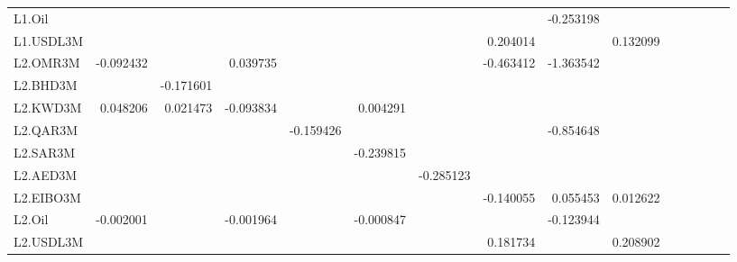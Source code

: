 \documentclass[12pt]{article}
\begin{document}
\begin{sloppypar}
\begin{table}[ht]
{\begin{tabular}{lrrrrrrrrrrrrrr}
        L1.Oil &  &  &  &  &  &  &  & -0.253198 &  \\
        L1.USDL3M &  &  &  &  &  &  & 0.204014 &  & 0.132099\\
        L2.OMR3M & -0.092432 &  & 0.039735 &  &  &  & -0.463412 & -1.363542 &  \\
        L2.BHD3M &  & -0.171601 &  &  &  &  &  &  &  \\
        L2.KWD3M & 0.048206 & 0.021473 & -0.093834 &  & 0.004291 &  &  &  &  \\
        L2.QAR3M &  &  &  & -0.159426 &  &  &  & -0.854648 &  \\
        L2.SAR3M &  &  &  &  & -0.239815 &  &  &  &  \\
        L2.AED3M &  &  &  &  &  & -0.285123 &  &  &  \\
        L2.EIBO3M &  &  &  &  &  &  & -0.140055 & 0.055453 & 0.012622 \\
        L2.Oil & -0.002001 &  & -0.001964 &  & -0.000847 &  &  & -0.123944 &  \\
        L2.USDL3M &  &  &  &  &  &  & 0.181734 &  & 0.208902\\
        \hline
    \end{tabular}}%
\end{table}


\end{sloppypar}
\end{document}
